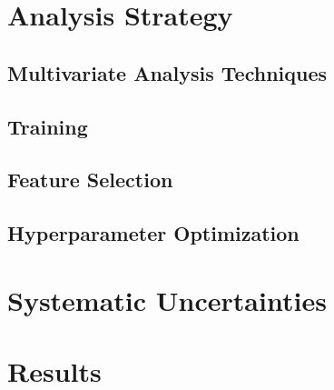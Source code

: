 	\section{Analysis Strategy}\label{sec:ana-strat}

		\subsection{Multivariate Analysis Techniques}\label{ssec:mva}

		\subsection{Training}\label{ssec:training}

		\subsection{Feature Selection}\label{ssec:features}

		\subsection{Hyperparameter Optimization}\label{ssec:hpo}

	\section{Systematic Uncertainties}\label{sec:systs}

	\section{Results}\label{sec:results}

